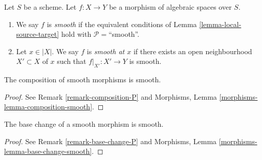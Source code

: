 \begin{definition}
\label{definition-smooth}
Let $S$ be a scheme.
Let $f : X \to Y$ be a morphism of algebraic spaces over $S$.
\begin{enumerate}
\item We say $f$ is {\it smooth} if the equivalent conditions of
Lemma \ref{lemma-local-source-target} hold with
$\mathcal{P} =$``smooth''.
\item Let $x \in |X|$. We say $f$ is {\it smooth at $x$} if there exists
an open neighbourhood $X' \subset X$ of $x$ such that $f|_{X'} : X' \to Y$
is smooth.
\end{enumerate}
\end{definition}

\begin{lemma}
\label{lemma-composition-smooth}
The composition of smooth morphisms is smooth.
\end{lemma}

\begin{proof}
See Remark \ref{remark-composition-P} and
Morphisms, Lemma \ref{morphisms-lemma-composition-smooth}.
\end{proof}

\begin{lemma}
\label{lemma-base-change-smooth}
The base change of a smooth morphism is smooth.
\end{lemma}

\begin{proof}
See Remark \ref{remark-base-change-P} and
Morphisms, Lemma \ref{morphisms-lemma-base-change-smooth}.
\end{proof}

